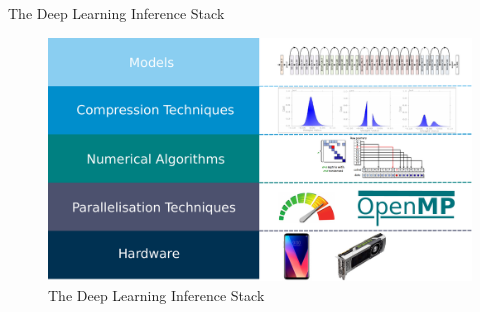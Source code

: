 \documentclass{beamer}
\begin{document}
\begin{frame}{The Deep Learning Inference Stack}
\begin{figure}
    \centering
    \includegraphics[width=\linewidth]{images/inference-stack.pdf}
    \caption{The Deep Learning Inference Stack}
    \label{fig:inference-stack}
\end{figure}
\end{frame}
\end{document}

